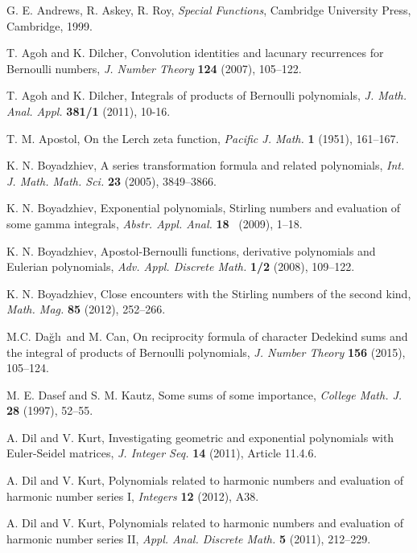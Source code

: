 \documentclass{article}%
\begin{document}
\begin{thebibliography}{99}                                                                                               %


G. E. Andrews, R. Askey, R. Roy, \textit{Special Functions},
Cambridge University Press, Cambridge, 1999.

T. Agoh and K. Dilcher, Convolution identities and lacunary
recurrences for Bernoulli numbers, \textit{J. Number Theory} \textbf{124}
(2007), 105--122.

T. Agoh and K. Dilcher, Integrals of products of Bernoulli
polynomials, \textit{J. Math. Anal. Appl.} \textbf{381/1} (2011), 10-16.

T. M. Apostol, On the Lerch zeta function, \textit{Pacific
J. Math.} \textbf{1} (1951), 161--167.

K. N. Boyadzhiev, A series transformation formula and related
polynomials, \textit{Int. J. Math. Math. Sci.} \textbf{23} (2005), 3849--3866.

K. N. Boyadzhiev, Exponential polynomials, Stirling numbers and
evaluation of some gamma integrals, \textit{Abstr. Appl. Anal.} \textbf{18}%
\ (2009), 1--18.

K. N. Boyadzhiev, Apostol-Bernoulli functions, derivative
polynomials and Eulerian polynomials, \textit{Adv. Appl. Discrete Math.}
\textbf{1/2} (2008), 109--122.

K. N. Boyadzhiev, Close encounters with the Stirling numbers of
the second kind, \textit{Math. Mag.} \textbf{85} (2012), 252--266.

M.C. Da\u{g}l\i\ and M. Can, On reciprocity formula of
character Dedekind sums and the integral of products of Bernoulli polynomials,
\textit{J. Number Theory} \textbf{156} (2015), 105--124.

M. E. Dasef and S. M. Kautz, Some sums of some importance,
\textit{College Math. J.} \textbf{28} (1997), 52--55.

A. Dil and V. Kurt, Investigating geometric and exponential
polynomials with Euler-Seidel matrices, \textit{J. Integer Seq.} \textbf{14}
(2011), Article 11.4.6.

A. Dil and V. Kurt, Polynomials related to harmonic numbers and
evaluation of harmonic number series I, \textit{Integers} \textbf{12} (2012), A38.

A. Dil and V. Kurt, Polynomials related to harmonic numbers and
evaluation of harmonic number series II, \textit{Appl. Anal. Discrete Math.}
\textbf{5} (2011), 212--229.


\end{thebibliography}
\end{document}
